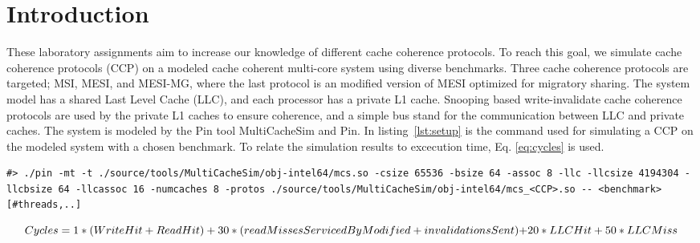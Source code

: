 \section{Introduction}
\label{sec:int}
These laboratory assignments aim to increase our knowledge of different cache coherence protocols. To reach this goal, we simulate cache coherence protocols (CCP) on a modeled cache coherent multi-core system using diverse benchmarks. Three cache coherence protocols are targeted; MSI, MESI, and MESI-MG, where the last protocol is an modified version of MESI optimized for migratory sharing. The system model has a shared Last Level Cache (LLC), and each processor has a private L1 cache. Snooping based write-invalidate cache coherence protocols are used by the private L1 caches to ensure coherence, and a simple bus stand for the communication between LLC and private caches. The system is modeled by the Pin tool MultiCacheSim and Pin. In listing~\ref{lst:setup} is the command used for simulating a CCP on the modeled system with a chosen benchmark. To relate the simulation results to excecution time, Eq. \ref{eq:cycles} is used. 



\begin{lstlisting}[label=lst:setup, basicstyle=\scriptsize, caption={Command used for simulation.}]
#> ./pin -mt -t ./source/tools/MultiCacheSim/obj-intel64/mcs.so -csize 65536 -bsize 64 -assoc 8 -llc -llcsize 4194304 -llcbsize 64 -llcassoc 16 -numcaches 8 -protos ./source/tools/MultiCacheSim/obj-intel64/mcs_<CCP>.so -- <benchmark> [#threads,..]
\end{lstlisting}
\begin{equation}
	$$\label{eq:cycles}$$
	Cycles = 1 * (WriteHit+ReadHit) + 30 * (readMissesServicedByModified + invalidationsSent)$$ $$+ 20 * LLCHit + 50 * LLCMiss
\end{equation}